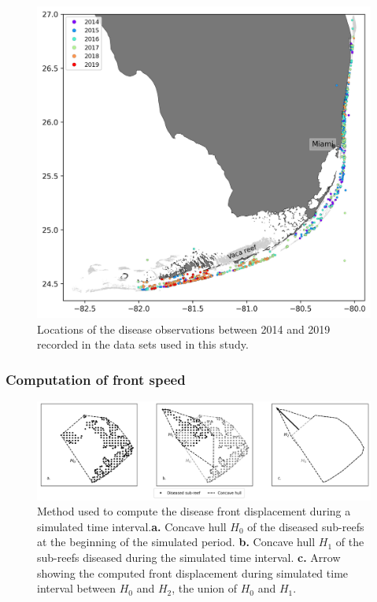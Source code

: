 \begin{figure}
    \center
    \includegraphics[width=.8\textwidth]{chapters/sctld/figures/monitoring.jpg}
    \caption{Locations of the disease observations between 2014 and 2019 recorded in the data sets used in this study.}
    \label{fig:stns}
\end{figure}

\subsubsection{Computation of front speed}

\begin{figure}
    \centering
    \includegraphics[width=.99\linewidth]{chapters/sctld/figures/hull_example_2.jpg}
    \caption{Method used to compute the disease front displacement during a simulated time interval.\textbf{a.} Concave hull $H_0$ of the diseased sub-reefs at the beginning of the simulated period. \textbf{b.} Concave hull $H_1$ of the sub-reefs diseased during the simulated time interval. \textbf{c.} Arrow showing the computed front displacement during simulated time interval between $H_0$ and $H_2$, the union of $H_0$ and $H_1$.}
    \label{fig:hull}
\end{figure}

